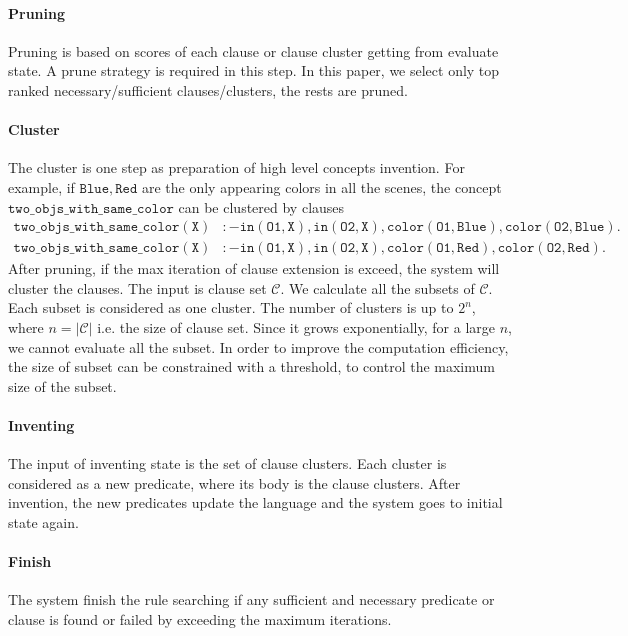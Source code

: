 \documentclass[
]{ceurart}
\begin{document}
\paragraph{Pruning}
Pruning is based on scores of each clause or clause cluster getting from evaluate state. A prune strategy is required in this step. In this paper, we select only top ranked necessary/sufficient clauses/clusters, the rests are pruned. 

\paragraph{Cluster}
The cluster is one step as preparation of high level concepts invention. 
For example, if $ \mathtt{Blue}, \mathtt{Red} $ are the only appearing colors in all the scenes,  the concept $ \mathtt{two\_objs\_with\_same\_color} $ can be clustered by clauses 
\begin{align*}
	\mathtt{two\_objs\_with\_same\_color(X)}&\mathtt{:-in(O1,X),in(O2,X),color(O1,Blue),color(O2,Blue).}\\ \mathtt{two\_objs\_with\_same\_color(X)}&:\mathtt{-in(O1,X),in(O2,X),color(O1,Red),color(O2,Red).}
\end{align*}
After pruning, if the max iteration of clause extension is exceed, the system will cluster the clauses. The input is clause set $ \mathcal{C} $. 
We calculate all the subsets of $ \mathcal{C} $. Each subset is considered as one cluster. The number of clusters is up to $ 2^n $, where $ n=|\mathcal{C}| $ i.e. the size of clause set. Since it grows exponentially, for a large $ n $, we cannot evaluate all the subset. In order to improve the computation efficiency, the size of subset can be constrained with a threshold, to control the maximum size of the subset.

\paragraph{Inventing}
The input of inventing state is the set of clause clusters. Each cluster is considered as a new predicate, where its body is the clause clusters. After invention, the new predicates update the language and the system goes to initial state again.

\paragraph{Finish} 
The system finish the rule searching if any sufficient and necessary predicate or clause is found or failed by exceeding the maximum iterations.
\end{document}
